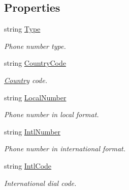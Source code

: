 \subsection*{Properties}
\begin{DoxyCompactItemize}
\item 
string \hyperlink{class_thecallr_api_1_1_objects_1_1_misc_1_1_number_infos_ae4ba0a4313475b612d4b5167f332eea9}{Type}
\begin{DoxyCompactList}\small\item\em Phone number type. \end{DoxyCompactList}\item 
string \hyperlink{class_thecallr_api_1_1_objects_1_1_misc_1_1_number_infos_ac6fb602f28b1dce10083f04ed472943a}{Country\+Code}
\begin{DoxyCompactList}\small\item\em \hyperlink{class_thecallr_api_1_1_objects_1_1_misc_1_1_country}{Country} code. \end{DoxyCompactList}\item 
string \hyperlink{class_thecallr_api_1_1_objects_1_1_misc_1_1_number_infos_aca1096c61e512e9d55171f0909d94e01}{Local\+Number}
\begin{DoxyCompactList}\small\item\em Phone number in local format. \end{DoxyCompactList}\item 
string \hyperlink{class_thecallr_api_1_1_objects_1_1_misc_1_1_number_infos_a427093687a02e4a7e5a363ff4c866920}{Intl\+Number}
\begin{DoxyCompactList}\small\item\em Phone number in international format. \end{DoxyCompactList}\item 
string \hyperlink{class_thecallr_api_1_1_objects_1_1_misc_1_1_number_infos_ade28ebae679b2831bb3e7eb78beebe46}{Intl\+Code}
\begin{DoxyCompactList}\small\item\em International dial code. \end{DoxyCompactList}\item 

\end{DoxyCompactItemize}
